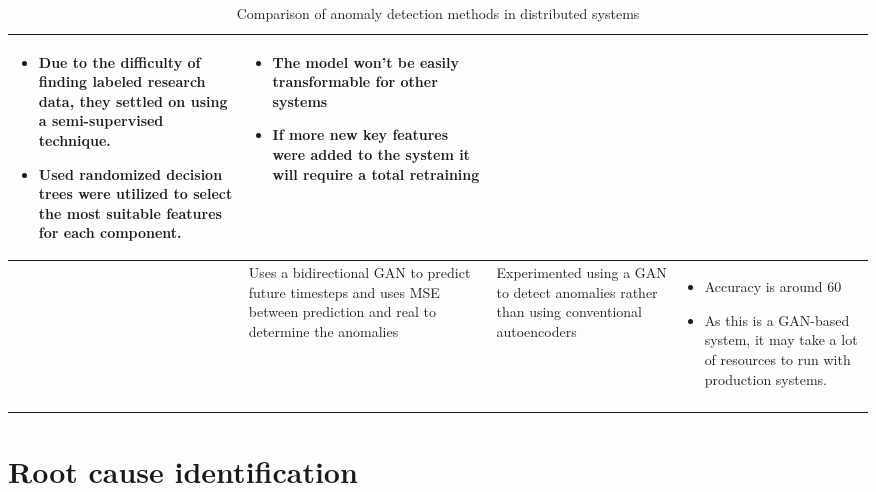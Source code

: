 \begin{longtable}{| p{20mm} | p{43mm} | p{43mm} | p{43mm} |}
  \vspace{-8mm}
  \begin{itemize}[leftmargin=*,noitemsep,nolistsep] 
    \item Due to the difficulty of finding labeled research data, they settled on using a semi-supervised technique.
    \item Used randomized decision trees were utilized to select the most suitable features for each component.
  \vspace{-7mm}
  \end{itemize} &
  \vspace{-8mm}
  \begin{itemize}[leftmargin=*,noitemsep,nolistsep] 
    \item The model won't be easily transformable for other systems
    \item If more new key features were added to the system it will require a total retraining
  \vspace{-7mm}
  \end{itemize} \\ \hline
  \cite{kumarage2019generative} &
  Uses a bidirectional GAN to predict future timesteps and uses MSE between prediction and real to determine the anomalies &
  Experimented using a GAN to detect anomalies rather than using conventional autoencoders &
  \vspace{-8mm}
  \begin{itemize}[leftmargin=*,noitemsep,nolistsep] 
    \item Accuracy is around 60%
    \item As this is a GAN-based system, it may take a lot of resources to run with production systems.
  \end{itemize} \\ \hline
  \caption{Comparison of anomaly detection methods in distributed systems}
\end{longtable}

\section{Root cause identification}

